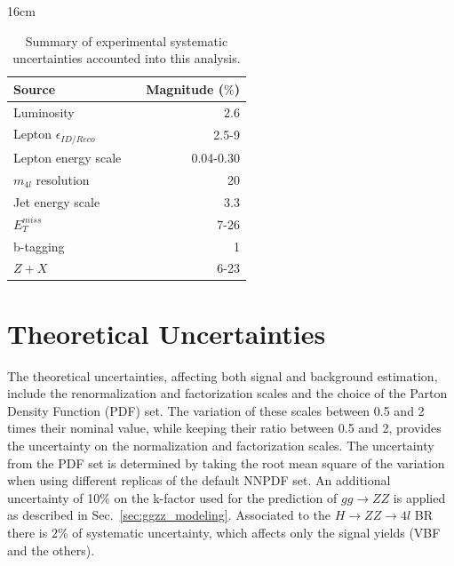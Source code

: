 \begin{table}[hbtp]{16cm}
	\label{tab:experimental_systematic_uncertainties}
	\caption{Summary of experimental systematic uncertainties accounted into this analysis.}
	\centering
	\begin{tabular}{lcr}
		\hline
		\rowcolor{light_gray}
		Source                        && Magnitude ($\%$)\\
		\hline
		Luminosity                    && 2.6\\
		Lepton $\epsilon_{ID/Reco}$   && 2.5-9\\
		Lepton energy scale           && 0.04-0.30\\
		$m_{4l}$ resolution           && 20\\
		Jet energy scale              && 3.3\\
		$E_{T}^{miss}$                && 7-26\\
		b-tagging                     && 1\\
		$Z+X$                         && 6-23\\
		\hline
	\end{tabular}
\end{table}

\section{Theoretical Uncertainties}
\label{theoretical_uncertainties}
The theoretical uncertainties, affecting both signal and background estimation, include the renormalization and factorization scales and the choice of the Parton Density Function (PDF) set. The variation of these scales between 0.5 and 2 times their nominal value, while keeping their ratio between 0.5 and 2, provides the uncertainty on the normalization and factorization scales. The uncertainty from the PDF set is determined by taking the root mean square of the variation when using different replicas of the default NNPDF set. An additional uncertainty of 10$\%$ on the k-factor used for the prediction of $gg \rightarrow ZZ$ is applied as described in Sec.~\ref{sec:ggzz_modeling}. Associated to the $H \rightarrow ZZ \rightarrow 4l$ BR there is $2\%$ of systematic uncertainty, which affects only the signal yields (VBF and the others).

